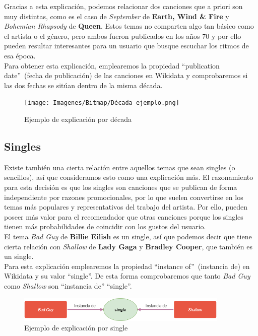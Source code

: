 Gracias a esta explicación, podemos relacionar dos canciones que a priori son muy distintas, como es el caso de \textit{September} de \textbf{Earth, Wind \& Fire} y \textit{Bohemian Rhapsody} de \textbf{Queen}. Estos temas no comparten algo tan básico como el artista o el género, pero ambos fueron publicados en los años 70 y por ello pueden resultar interesantes para un usuario que busque escuchar los ritmos de esa época.\\

Para obtener esta explicación, emplearemos la propiedad ``publication date''~(fecha de publicación) de las canciones en Wikidata y comprobaremos si las dos fechas se sitúan dentro de la misma década.\\

\begin{figure}[h!]
	\centering
	\texttt{[image: Imagenes/Bitmap/Década ejemplo.png]}
	\caption{Ejemplo de explicación por década}
	\label{fig:sampleImage}
\end{figure}

\subsection*{Singles}

Existe también una cierta relación entre aquellos temas que sean singles (o sencillos), así que consideramos esto como una explicación más. El razonamiento para esta decisión es que los singles son canciones que se publican de forma independiente por razones promocionales, por lo que suelen convertirse en los temas más populares y representativos del trabajo del artista. Por ello, pueden poseer más valor para el recomendador que otras canciones porque los singles tienen más probabilidades de coincidir con los gustos del usuario.\\

El tema \textit{Bad Guy} de \textbf{Billie Eilish} es un single, así que podemos decir que tiene cierta relación con \textit{Shallow} de \textbf{Lady Gaga} y \textbf{Bradley Cooper}, que también es un single.\\

Para esta explicación emplearemos la propiedad ``instance of''~(instancia de) en Wikidata y su valor ``single''. De esta forma comprobaremos que tanto \textit{Bad Guy} como \textit{Shallow} son ``instancia de'' ``single''.\\

\begin{figure}[h!]
	\centering
	\includegraphics[width = 0.9\textwidth]{Imagenes/Bitmap/Single ejemplo.png}
	\caption{Ejemplo de explicación por single}
	\label{fig:sampleImage}
\end{figure}

